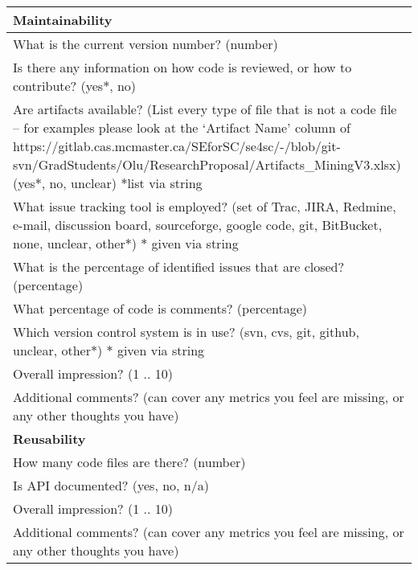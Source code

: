 \begin{table}[H]
\begin{tabular}{p{14cm}}
\hline	
\textbf{Maintainability}\\
\hline
What is the current version number? (number)\\
Is there any information on how code is reviewed, or how to contribute? ({yes$\ast$, no})\\
Are artifacts available? (List every type of file that is not a code file – for examples please look at the ‘Artifact Name’ column of https://gitlab.cas.mcmaster.ca/SEforSC/se4sc/-/blob/git-svn/GradStudents/Olu/ResearchProposal/Artifacts\_MiningV3.xlsx) ({yes$\ast$, no, unclear}) $\ast$list via string\\
What issue tracking tool is employed? (set of {Trac, JIRA, Redmine, e-mail, discussion board, sourceforge, google code, git, BitBucket, none, unclear, other$\ast$}) $\ast$ given via string\\
What is the percentage of identified issues that are closed? (percentage)\\
What percentage of code is comments? (percentage)\\
Which version control system is in use? ({svn, cvs, git, github, unclear, other$\ast$}) $\ast$ given via string\\
Overall impression? ({1 .. 10})\\
Additional comments? (can cover any metrics you feel are missing, or any other thoughts you have)\\
\hline		
\textbf{Reusability}\\
\hline
How many code files are there? (number)\\
Is API documented? ({yes, no, n/a})\\
Overall impression? ({1 .. 10})\\
Additional comments? (can cover any metrics you feel are missing, or any other thoughts you have)\\
\hline		
\end{tabular}
\end{table}

